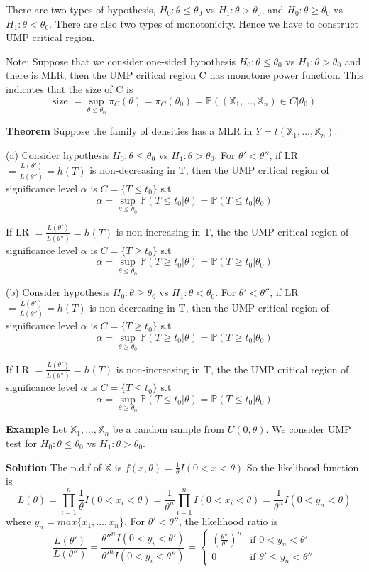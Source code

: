 There are two types of hypothesis, $H_0: \theta \leq \theta_0$ vs $H_1: \theta > \theta_0$, and $H_0: \theta \geq \theta_0$ vs $H_1: \theta < \theta_0$. There are also two types of monotonicity. Hence we have to construct UMP critical region.

Note: Suppose that we consider one-sided hypothesis $H_0: \theta \leq \theta_0$ vs $H_1: \theta > \theta_0$ and there is MLR, then the UMP critical region C has monotone power function. This indicates that the size of C is
$$\text{size } = \underset{\theta \leq\theta_0}{\sup} \pi_C(\theta) = \pi_C(\theta_0) = \mathbb{P}((\mathbb{X}_1, ..., \mathbb{X}_n) \in C | \theta_0)$$

\textbf{Theorem} Suppose the family of densities has a MLR in $Y = t(\mathbb{X}_1, ..., \mathbb{X}_n)$.

(a) Consider hypothesis $H_0: \theta \leq \theta_0$ vs $H_1: \theta > \theta_0$. For $\theta' < \theta''$, if LR $ = \frac{L(\theta')}{L(\theta'')} = h(T)$ is non-decreasing in T, then the UMP critical region of significance level $\alpha$ is $C = \{T\leq t_0\}$ s.t
$$\alpha = \underset{\theta \leq\theta_0}{\sup} \mathbb{P}(T\leq t_0 | \theta) = \mathbb{P}(T\leq t_0 | \theta_0)$$

If  LR $ = \frac{L(\theta')}{L(\theta'')} = h(T)$ is non-increasing in T, the the UMP critical region of significance level $\alpha$ is $C = \{T\geq t_0\}$ s.t
$$\alpha = \underset{\theta \leq\theta_0}{\sup} \mathbb{P}(T\geq t_0 | \theta) = \mathbb{P}(T\geq t_0 | \theta_0)$$

(b) Consider hypothesis $H_0: \theta \geq \theta_0$ vs $H_1: \theta < \theta_0$. For $\theta' < \theta''$, if LR $ = \frac{L(\theta')}{L(\theta'')} = h(T)$ is non-decreasing in T, then the UMP critical region of significance level $\alpha$ is $C = \{T\geq t_0\}$ s.t
$$\alpha = \underset{\theta \geq\theta_0}{\sup} \mathbb{P}(T\geq t_0 | \theta) = \mathbb{P}(T\geq t_0 | \theta_0)$$

If  LR $ = \frac{L(\theta')}{L(\theta'')} = h(T)$ is non-increasing in T, the the UMP critical region of significance level $\alpha$ is $C = \{T\leq t_0\}$ s.t
$$\alpha = \underset{\theta \geq\theta_0}{\sup} \mathbb{P}(T\leq t_0 | \theta) = \mathbb{P}(T\leq t_0 | \theta_0)$$

\textbf{Example} Let  $\mathbb{X}_1, ..., \mathbb{X}_n$ be a random sample from $U(0, \theta)$. We consider UMP test for $H_0: \theta \leq \theta_0$ vs $H_1: \theta > \theta_0$.

\textbf{Solution} The p.d.f of $\mathbb{X}$ is $f(x, \theta) = \frac{1}{\theta}I(0<x<\theta)$ So the likelihood function is
$$L(\theta) = \prod_{i=1}^n \frac{1}{\theta}I(0<x_i<\theta) = \frac{1}{\theta^n}  \prod_{i=1}^nI(0<x_i<\theta) = \frac{1}{\theta^n}I(0<y_n<\theta)$$
where $y_n = max\{x_1, ..., x_n\}$. For $\theta' < \theta''$, the likelihood ratio is 
$$\frac{L(\theta')}{L(\theta'')} = \frac{\theta''^n I(0<y_i<\theta')}{\theta'^n I(0<y_i<\theta'')}
=\begin{cases}
(\frac{\theta''}{\theta'})^n & \text{if } 0 < y_n < \theta' \\
0 & \text{if } \theta' \leq y_n < \theta'' 
\end{cases}$$

